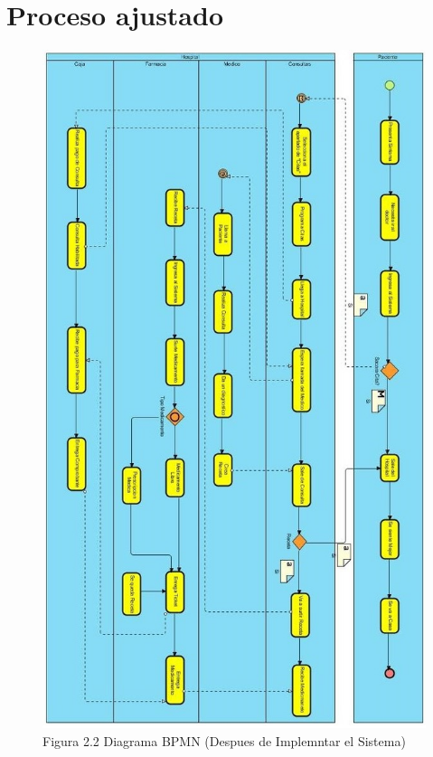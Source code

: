 \section{Proceso ajustado}

\begin{figure}[htbp!]
\centering
		\includegraphics[width=.8\textwidth]{images/diagramabpm}
		\caption{Figura 2.2 Diagrama BPMN (Despues de Implemntar el Sistema)}
	\end{figure}
\newpage
